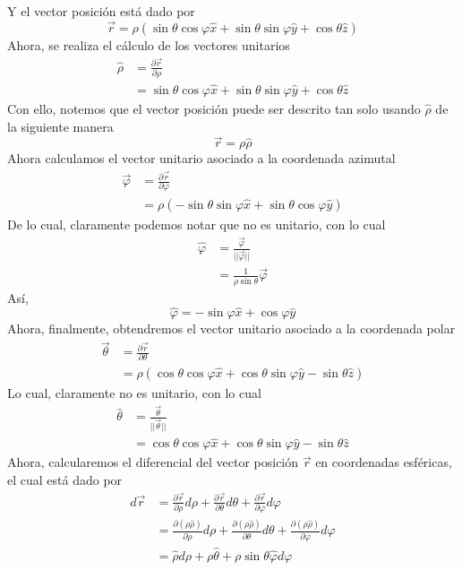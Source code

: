 \documentclass[11pt,letterpaper]{article}
\begin{document}
Y el vector posición está dado por
\begin{equation}
    \vec{r}=\rho(\sin{\theta}\cos{\varphi}\hat{x}+\sin{\theta}\sin{\varphi}\hat{y}+\cos{\theta}\hat{z})
\end{equation}
Ahora, se realiza el cálculo de los vectores unitarios
\begin{align*}
    \hat{\rho} & = \frac{\partial \vec{r}}{\partial \rho} \\
    & = \sin{\theta}\cos{\varphi}\hat{x}+\sin{\theta}\sin{\varphi}\hat{y}+\cos{\theta}\hat{z}
\end{align*}
Con ello, notemos que el vector posición puede ser descrito tan solo usando $\hat{\rho}$ de la siguiente manera
\begin{equation}
    \vec{r}=\rho\hat{\rho}
\end{equation}
Ahora calculamos el vector unitario asociado a la coordenada azimutal
\begin{align*}
    \vec{\varphi} & = \frac{\partial \vec{r}}{\partial \varphi} \\
    & = \rho( -\sin{\theta}\sin{\varphi}\hat{x} + \sin{\theta}\cos{\varphi}\hat{y})
\end{align*}
De lo cual, claramente podemos notar que no es unitario, con lo cual
\begin{align*}
    \hat{\varphi} & =\frac{\vec{\varphi}}{||\vec{\varphi}||} \\
    & = \frac{1}{\rho\sin{\theta}}\vec{\varphi}
\end{align*}
Así,
\begin{equation}
    \hat{\varphi}= - \sin{\varphi}\hat{x}+\cos{\varphi}\hat{y}
\end{equation}
Ahora, finalmente, obtendremos el vector unitario asociado a la coordenada polar
\begin{align*}
    \vec{\theta} & =\frac{\partial \vec{r}}{\partial \theta} \\
    & = \rho(\cos{\theta}\cos{\varphi}\hat{x}+\cos{\theta}\sin{\varphi}\hat{y}-\sin{\theta}\hat{z})
\end{align*}
Lo cual, claramente no es unitario, con lo cual
\begin{align*}
    \hat{\theta} & = \frac{\vec{\theta}}{||\vec{\theta}||} \\
    & = \cos{\theta}\cos{\varphi}\hat{x}+\cos{\theta}\sin{\varphi}\hat{y}-\sin{\theta}\hat{z}
\end{align*}
Ahora, calcularemos el diferencial del vector posición $\vec{r}$ en coordenadas esféricas, el cual está dado por
\begin{align*}
    d\vec{r} & =\frac{\partial \vec{r}}{\partial \rho} d\rho + \frac{\partial \vec{r}}{\partial \theta} d\theta + \frac{\partial \vec{r}}{\partial \varphi}d\varphi \\
    & = \frac{\partial (\rho\hat{\rho})}{\partial \rho} d\rho + \frac{\partial (\rho\hat{\rho})}{\partial \theta} d\theta + \frac{\partial (\rho\hat{\rho})}{\partial \varphi}d\varphi \\
    & = \hat{\rho}d\rho + \rho \hat{\theta} + \rho \sin{\theta} \hat{\varphi}d\varphi \\
\end{align*}
\end{document}
